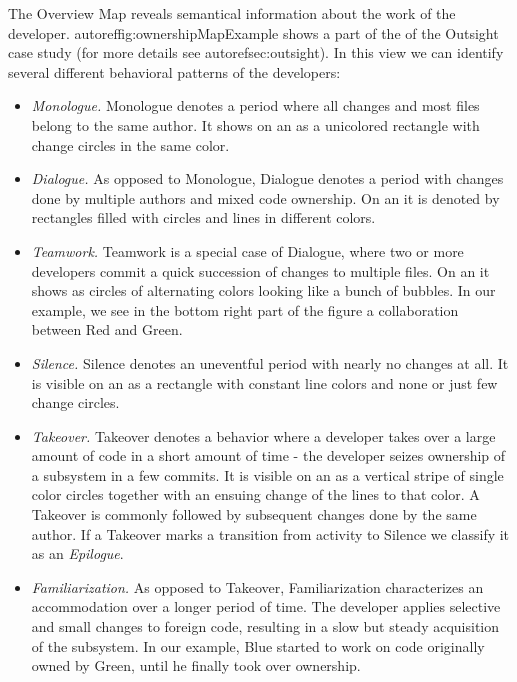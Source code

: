 The Overview Map reveals semantical information about the work of the developer. autoref{fig:ownershipMapExample} shows a part of the \omap of the Outsight case study (for more details see  autoref{sec:outsight}). In this view we can identify several different behavioral patterns of the developers:

\begin{itemize}

\item \emph{Monologue.} Monologue denotes a period where all changes and most files belong to the same author. It shows on an \omap as a unicolored rectangle with change circles in the same color.

\item \emph{Dialogue.} As opposed to Monologue, Dialogue denotes a period with changes done by multiple authors and mixed code ownership. On an \omap it is denoted by rectangles filled with circles and lines in different colors.

\item \emph{Teamwork.} Teamwork is a special case of Dialogue, where two or more developers commit a quick succession of changes to multiple files. On an \omap it shows as circles of alternating colors looking like a bunch of bubbles. In our example, we see in the bottom right part of the figure a collaboration between Red and Green.

\item \emph{Silence.} Silence denotes an uneventful period with nearly no changes at all. It is visible on an \omap as a rectangle with constant line colors and none or just few change circles.

\item \emph{Takeover.} Takeover denotes a behavior where a developer takes over a large amount of code in a short amount of time \-- \ie the developer seizes ownership of a subsystem in a few commits. It is visible on an \omap as a vertical stripe of single color circles together with an ensuing change of the lines to that color. A Takeover is commonly followed by subsequent changes done by the same author. If a Takeover marks a transition from activity to Silence we classify it as an \emph{Epilogue}.

\item \emph{Familiarization.} As opposed to Takeover, Familiarization characterizes an accommodation over a longer period of time. The developer applies selective and small changes to foreign code, resulting in a slow but steady acquisition of the subsystem. In our example, Blue started to work on code originally owned by Green, until he finally took over ownership.


\end{itemize}
